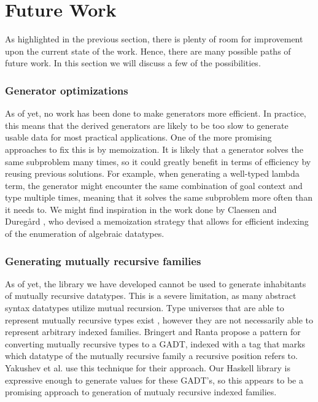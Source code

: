 \documentclass[a4paper,msc,twosized=semi]{uustthesis}
\begin{document}
\section{Future Work}

  As highlighted in the previous section, there is plenty of room for improvement upon the current state of the work. Hence, there are many possible paths of future work. In this section we will discuss a few of the possibilities. 

\subsubsection{Generator optimizations}

  As of yet, no work has been done to make generators more efficient. In practice, this means that the derived generators are likely to be too slow to generate usable data for most practical applications. One of the more promising approaches to fix this is by memoization. It is likely that a generator solves the same subproblem many times, so it could greatly benefit in terms of efficiency by reusing previous solutions. For example, when generating a well-typed lambda term, the generator might encounter the same combination of goal context and type multiple times, meaning that it solves the same subproblem more often than it needs to. We might find inspiration in the work done by Claessen and Dureg{\aa}rd \cite{duregaard2013feat}, who devised a memoization strategy that allows for efficient indexing of the enumeration of algebraic datatypes. 

\subsubsection{Generating mutually recursive families}

  As of yet, the library we have developed cannot be used to generate inhabitants of mutually recursive datatypes. This is a severe limitation, as many abstract syntax datatypes utilize mutual recursion. Type universes that are able to represent mutually recursive types exist \cite{miraldo2018sums , yakushev2009generic}, however they are not necessarily able to represent arbitrary indexed families. Bringert and Ranta \cite{bringert2006pattern} propose a pattern for converting mutually recursive types to a GADT, indexed with a tag that marks which datatype of the mutually recursive family a recursive position refers to. Yakushev et al. \cite{yakushev2009generic} use this technique for their approach. Our Haskell library is expressive enough to generate values for these GADT's, so this appears to be a promising approach to generation of mutualy recursive indexed families. 
\end{document}
